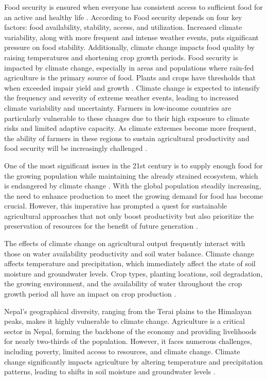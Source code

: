 Food security is ensured when everyone has consistent access to sufficient food for an active and healthy life \parencite{mulunehImpactClimateChange2021}. According to \textcite{kangClimateChangeImpacts2009} Food security depends on four key factors: food availability, stability, access, and utilization. Increased climate variability, along with more frequent and intense weather events, puts significant pressure on food stability. Additionally, climate change impacts food quality by raising temperatures and shortening crop growth periods. Food security is impacted by climate change, especially in areas and populations where rain-fed agriculture is the primary source of food. Plants and crops have thresholds that when exceeded impair yield and growth \parencite{mulunehImpactClimateChange2021}. Climate change is expected to intensify the frequency and severity of extreme weather events, leading to increased climate variability and uncertainty. Farmers in low-income countries are particularly vulnerable to these changes due to their high exposure to climate risks and limited adaptive capacity.  As climate extremes become more frequent, the ability of farmers in these regions to sustain agricultural productivity and food security will be increasingly challenged \parencite{budhathokiAssessingFarmersPreparedness2020}. 

One of the most significant issues in the 21st century is to supply enough food for the growing population while maintaining the already strained ecosystem, which is endangered by climate change \parencite{kangClimateChangeImpacts2009}. With the global population steadily increasing, the need to enhance production to meet the growing demand for food has become crucial. However, this imperative has prompted a quest for sustainable agricultural approaches that not only boost productivity but also prioritize the preservation of resources for the benefit of future generation \parencite{singhSocioeconomicStatusQualitative2022}. 

The effects of climate change on agricultural output frequently interact with those on water availability productivity and soil water balance. Climate change affects temperature and precipitation, which immediately affect the state of soil moisture and groundwater levels. Crop types, planting locations, soil degradation, the growing environment, and the availability of water throughout the crop growth period all have an impact on crop production \parencite{risalImpactClimateChange2022}.

Nepal's geographical diversity, ranging from the Terai plains to the Himalayan peaks, makes it highly vulnerable to climate change. Agriculture is a critical sector in Nepal, forming the backbone of the economy and providing livelihoods for nearly two-thirds of the population. However, it faces numerous challenges, including poverty, limited access to resources, and climate change. Climate change significantly impacts agriculture by altering temperature and precipitation patterns, leading to shifts in soil moisture and groundwater levels \parencite{gyawaliOverviewAgricultureNepal2021}.

